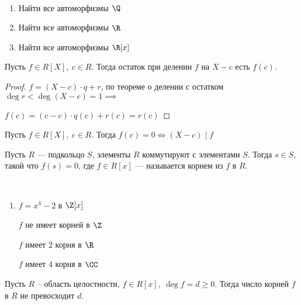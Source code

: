 \begin{exerc}~

    \begin{enumerate}
        \item Найти все автоморфизмы $\Q$
        
        \item Найти все автоморфизмы $\R$
        
        \item Найти все автоморфизмы $\R[x]$
    \end{enumerate}
\end{exerc}

\begin{theorem}[Безу]

    Пусть $f \in R[X],~ c \in R$. Тогда остаток при делении $f$ на $X - c$ есть $f(c)$.    
\end{theorem}

\begin{proof}

    $f = (X - c) \cdot q + r$, по теореме о делении с остатком $\deg r < \deg (X - c) = 1 \implies$
    
    $f(c) = (c - c) \cdot q(c) + r(c) = r(c)$
\end{proof}

\begin{follow}
    
    Пусть $f \in R[X],~c \in R$. Тогда $f(c) = 0 \iff (X - c) \mid f$
\end{follow}

\begin{defn}
    Пусть $R$ --- подкольцо $S$, элементы $R$ коммутируют с элементами $S$. Тогда $s \in S$, такой что $f(s) = 0$, где $f \in R[x]$ --- называется корнем из $f$ в $R$.
\end{defn}

\begin{examples}~

    \begin{enumerate}
        \item $f = x^4 - 2$ в $\Z[x]$
        
        $f$ не имеет корней в $\Z$

        $f$ имеет $2$ корня в $\R$

        $f$ имеет $4$ корня в $\CC$
    \end{enumerate}
\end{examples}

\begin{theorem-non}
    Пусть $R$ -- область целостности, $f \in R[x],~ \deg f = d \geq 0$. Тогда число корней $f$ в $R$ не превосходит $d$.
\end{theorem-non}

